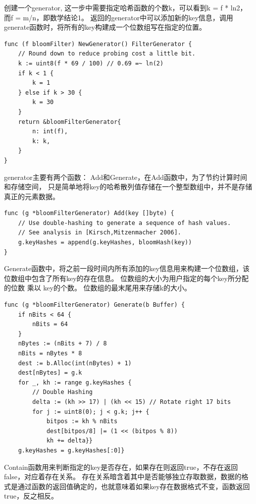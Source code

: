 \begin{enumerate}
创建一个generator, 这一步中需要指定哈希函数的个数k，可以看到k = f * ln2，而f = m/n，即数学结论1。
返回的generator中可以添加新的key信息，调用generate函数时，将所有的key构建成一个位数组写在指定的位置。

\begin{lstlisting}[caption=NewGenerator , label=code_radds_storage_NewGenerator]
func (f bloomFilter) NewGenerator() FilterGenerator {
	// Round down to reduce probing cost a little bit.
	k := uint8(f * 69 / 100) // 0.69 =~ ln(2)
	if k < 1 {
		k = 1
	} else if k > 30 {
		k = 30
	}
	return &bloomFilterGenerator{
		n: int(f),
		k: k,
	}
}
\end{lstlisting}

generator主要有两个函数：
Add和Generate，在Add函数中，为了节约计算时间和存储空间，
只是简单地将key的哈希散列值存储在一个整型数组中，并不是存储真正的元素数据。


\begin{lstlisting}[caption=Add , label=code_radds_storage_Add]
func (g *bloomFilterGenerator) Add(key []byte) {
	// Use double-hashing to generate a sequence of hash values.
	// See analysis in [Kirsch,Mitzenmacher 2006].
	g.keyHashes = append(g.keyHashes, bloomHash(key))
}
\end{lstlisting}


Generate函数中，将之前一段时间内所有添加的key信息用来构建一个位数组，该位数组中包含了所有key的存在信息。
位数组的大小为用户指定的每个key所分配的位数 乘以 key的个数。
位数组的最末尾用来存储k的大小。

\begin{lstlisting}[caption=Generate , label=code_radds_storage_Generate]
func (g *bloomFilterGenerator) Generate(b Buffer) {
	if nBits < 64 {
		nBits = 64
	}
	nBytes := (nBits + 7) / 8
	nBits = nBytes * 8
	dest := b.Alloc(int(nBytes) + 1)
	dest[nBytes] = g.k
	for _, kh := range g.keyHashes {
		// Double Hashing
		delta := (kh >> 17) | (kh << 15) // Rotate right 17 bits
		for j := uint8(0); j < g.k; j++ {
			bitpos := kh % nBits
			dest[bitpos/8] |= (1 << (bitpos % 8))
			kh += delta}}
	g.keyHashes = g.keyHashes[:0]}
\end{lstlisting}


Contain函数用来判断指定的key是否存在，如果存在则返回true，不存在返回false，对应着存在关系。
存在关系暗含着其中是否能够独立存取数据，数据的格式是通过函数的返回值确定的，也就意味着如果key存在数据格式不变，函数返回true，反之相反。


\end{enumerate}
